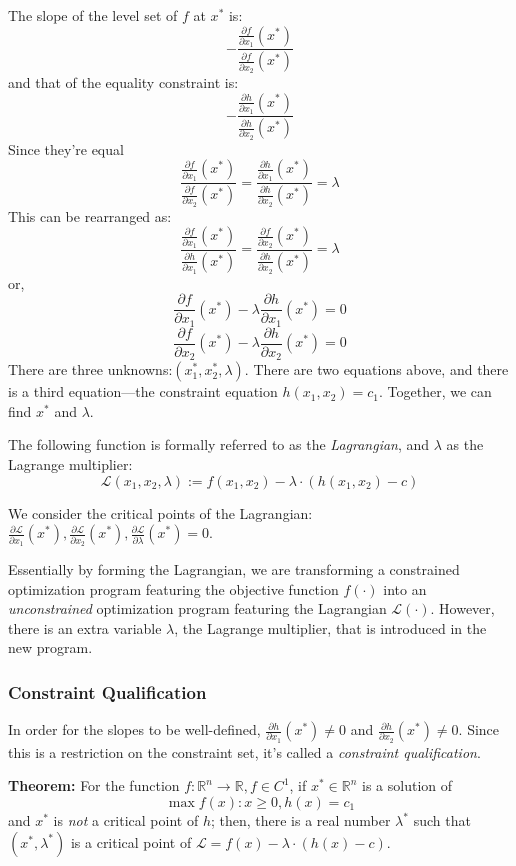 \documentclass[11pt,]{article}
\begin{document}
The slope of the level set of \(f\) at \(x^*\) is: \[
-\frac{\frac{\partial f}{\partial x_1}(x^*)}{\frac{\partial f}{\partial x_2}(x^*)}
\] and that of the equality constraint is: \[
-\frac{\frac{\partial h}{\partial x_1}(x^*)}{\frac{\partial h}{\partial x_2}(x^*)}
\] Since they're equal \[
\frac{\frac{\partial f}{\partial x_1}(x^*)}{\frac{\partial f}{\partial x_2}(x^*)} =
\frac{\frac{\partial h}{\partial x_1}(x^*)}{\frac{\partial h}{\partial x_2}(x^*)} =
\lambda
\] This can be rearranged as: \[
\frac{\frac{\partial f}{\partial x_1}(x^*)}{\frac{\partial h}{\partial x_1}(x^*)} =
\frac{\frac{\partial f}{\partial x_2}(x^*)}{\frac{\partial h}{\partial x_2}(x^*)} =
\lambda
\] or, \[
\frac{\partial f}{\partial x_1}(x^*)-\lambda\frac{\partial h}{\partial x_1}(x^*)=0
\] \[
\frac{\partial f}{\partial x_2}(x^*)-\lambda\frac{\partial h}{\partial x_2}(x^*)=0
\] There are three unknowns:\((x_1^*, x_2^*, \lambda)\). There are two
equations above, and there is a third equation---the constraint equation
\(h(x_1, x_2) = c_1\). Together, we can find \(x^*\) and \(\lambda\).

The following function is formally referred to as the \emph{Lagrangian},
and \(\lambda\) as the Lagrange multiplier: \[
\mathcal{L}(x_1,x_2,\lambda) := f(x_1,x_2)-\lambda\cdot(h(x_1,x_2)-c)
\]

We consider the critical points of the Lagrangian:
\(\frac{\partial \mathcal{L}}{\partial x_1}(x^*), \frac{\partial \mathcal{L}}{\partial x_2}(x^*), \frac{\partial \mathcal{L}}{\partial \lambda}(x^*)=0\).

Essentially by forming the Lagrangian, we are transforming a constrained
optimization program featuring the objective function \(f(\cdot)\) into
an \emph{unconstrained} optimization program featuring the Lagrangian
\(\mathcal{L}(\cdot)\). However, there is an extra variable \(\lambda\),
the Lagrange multiplier, that is introduced in the new program.

\subsubsection{Constraint Qualification}\label{constraint-qualification}

In order for the slopes to be well-defined,
\(\frac{\partial h}{\partial x_1}(x^*)\neq 0\) and
\(\frac{\partial h}{\partial x_2}(x^*)\neq 0\). Since this is a
restriction on the constraint set, it's called a \emph{constraint
qualification}.

\textbf{Theorem:} For the function
\(f:\mathbb{R}^n\to \mathbb{R}, f\in C^1\), if \(x^*\in \mathbb{R}^n\)
is a solution of \[\max f(x): x\geq 0, h(x)=c_1\] and \(x^*\) is
\emph{not} a critical point of \(h\); then, there is a real number
\(\lambda^*\) such that \((x^*,\lambda^*)\) is a critical point of
\(\mathcal{L}=f(x)-\lambda\cdot(h(x)-c)\).
\end{document}
